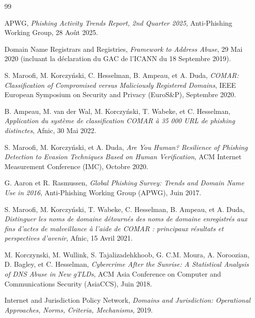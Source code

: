 \documentclass[final, 9pt, twocolumn]{saucis}
\begin{document}
\begin{thebibliography}{99}

 APWG, \emph{Phishing Activity Trends Report, 2nd Quarter 2025}, Anti-Phishing Working Group, 28 Août 2025.

 Domain Name Registrars and Registries, \emph{Framework to Address Abuse}, 29 Mai 2020 (incluant la déclaration du GAC de l'ICANN du 18 Septembre 2019).

 S. Maroofi, M. Korczyński, C. Hesselman, B. Ampeau, et A. Duda, \emph{COMAR: Classification of Compromised versus Maliciously Registered Domains}, IEEE European Symposium on Security and Privacy (EuroS\&P), Septembre 2020.

 B. Ampeau, M. van der Wal, M. Korczyński, T. Wabeke, et C. Hesselman, \emph{Application du système de classification COMAR à 35 000 URL de phishing distinctes}, Afnic, 30 Mai 2022.

 S. Maroofi, M. Korczyński, et A. Duda, \emph{Are You Human? Resilience of Phishing Detection to Evasion Techniques Based on Human Verification}, ACM Internet Measurement Conference (IMC), Octobre 2020.

 G. Aaron et R. Rasmussen, \emph{Global Phishing Survey: Trends and Domain Name Use in 2016}, Anti-Phishing Working Group (APWG), Juin 2017.

 S. Maroofi, M. Korczyński, T. Wabeke, C. Hesselman, B. Ampeau, et A. Duda, \emph{Distinguer les noms de domaine détournés des noms de domaine enregistrés aux fins d’actes de malveillance à l’aide de COMAR : principaux résultats et perspectives d’avenir}, Afnic, 15 Avril 2021.

 M. Korczynski, M. Wullink, S. Tajalizadehkhoob, G. C.M. Moura, A. Noroozian, D. Bagley, et C. Hesselman, \emph{Cybercrime After the Sunrise: A Statistical Analysis of DNS Abuse in New gTLDs}, ACM Asia Conference on Computer and Communications Security (AsiaCCS), Juin 2018.

 Internet and Jurisdiction Policy Network, \emph{Domains and Jurisdiction: Operational Approaches, Norms, Criteria, Mechanisms}, 2019.

\end{thebibliography}


\end{document}
